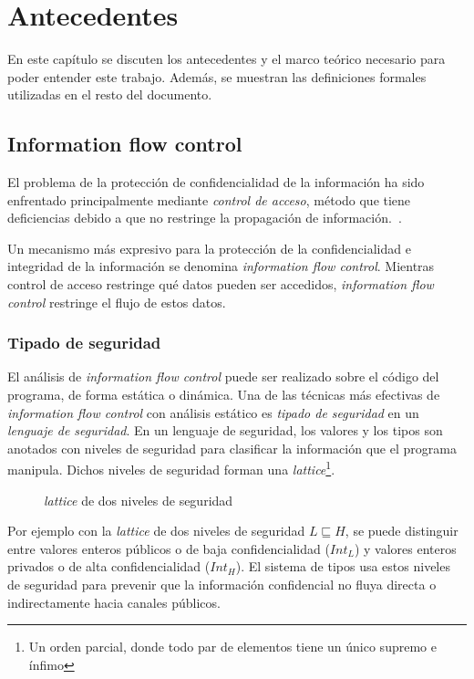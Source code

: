 \chapter{Antecedentes}

En este capítulo se discuten los antecedentes y el marco teórico necesario para poder entender este trabajo. Además, se muestran las definiciones formales utilizadas en el resto del documento.

\section{Information flow control}

	El problema de la protección de confidencialidad de la información ha sido enfrentado principalmente mediante \textit{control de acceso}, método que tiene deficiencias debido a que no restringe la propagación de información.~\cite{myers-phd}.

	Un mecanismo más expresivo para la protección de la confidencialidad e integridad de la información se denomina \textit{information flow control}. Mientras control de acceso restringe qué datos pueden ser accedidos, \textit{information flow control} restringe el flujo de estos datos.

	\subsection{Tipado de seguridad}
	El análisis de \textit{information flow control} puede ser realizado sobre el código del programa, de forma estática o dinámica. Una de las técnicas más efectivas de \textit{information flow control} con análisis estático es \textit{tipado de seguridad} en un \textit{lenguaje de seguridad}. En un lenguaje de seguridad, los valores y los tipos son anotados con niveles de seguridad para clasificar la información que el programa manipula. Dichos niveles de seguridad forman una \textit{lattice}\footnote{Un orden parcial, donde todo par de elementos tiene un único supremo e ínfimo}.

	\begin{figure}[ht]
		\centering
		\caption{\textit{lattice} de dos niveles de seguridad}
	\end{figure}


	Por ejemplo con la \textit{lattice} de dos niveles de seguridad $L \sqsubseteq H$, se puede distinguir entre valores enteros públicos o de baja confidencialidad ($Int_L$) y valores enteros privados o de alta confidencialidad ($Int_H$). El sistema de tipos usa estos niveles de seguridad para prevenir que la información confidencial no fluya directa o indirectamente hacia canales públicos\cite{volpanoAl:S96}. %

